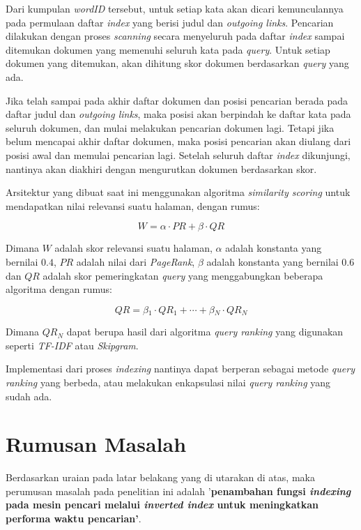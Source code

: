 Dari kumpulan \emph{wordID} tersebut, untuk setiap kata akan dicari
kemunculannya pada permulaan daftar \emph{index} yang berisi judul dan
\emph{outgoing links}.  Pencarian dilakukan dengan proses \emph{scanning} secara
menyeluruh pada daftar \emph{index} sampai ditemukan dokumen yang memenuhi
seluruh kata pada \emph{query}. Untuk setiap dokumen yang ditemukan, akan
dihitung skor dokumen berdasarkan \emph{query} yang ada.

Jika telah sampai pada akhir daftar dokumen dan posisi pencarian berada pada
daftar judul dan \emph{outgoing links}, maka posisi akan berpindah ke daftar
kata pada seluruh dokumen, dan mulai melakukan pencarian dokumen lagi. Tetapi
jika belum mencapai akhir daftar dokumen, maka posisi pencarian akan diulang
dari posisi awal dan memulai pencarian lagi. Setelah seluruh daftar
\emph{index} dikunjungi, nantinya akan diakhiri dengan mengurutkan dokumen
berdasarkan skor.

Arsitektur yang dibuat saat ini menggunakan algoritma \emph{similarity scoring}
untuk mendapatkan nilai relevansi suatu halaman, dengan rumus:

\begin{equation}
	W = \alpha{} \cdot{} PR + \beta{} \cdot{} QR
\end{equation}

Dimana $W$ adalah skor relevansi suatu halaman, $\alpha{}$ adalah konstanta yang
bernilai $0.4$, $PR$ adalah nilai dari \emph{PageRank}, $\beta{}$ adalah
konstanta yang bernilai $0.6$ dan $QR$ adalah skor pemeringkatan \emph{query}
yang menggabungkan beberapa algoritma dengan rumus:

\begin{equation}
	QR = \beta{}_1 \cdot{} QR_1 + \cdots{} + \beta{}_N \cdot{} QR_N
\end{equation}

Dimana $QR_N$ dapat berupa hasil dari algoritma \emph{query ranking} yang
digunakan seperti \emph{TF-IDF} atau \emph{Skipgram}.

Implementasi dari proses \emph{indexing} nantinya dapat berperan sebagai
metode \emph{query ranking} yang berbeda, atau melakukan enkapsulasi nilai
\emph{query ranking} yang sudah ada.

\section{Rumusan Masalah}
Berdasarkan uraian pada latar belakang yang di utarakan di atas, maka perumusan
masalah pada penelitian ini adalah '\textbf{penambahan fungsi \textit{indexing}
pada mesin pencari melalui \textit{inverted index} untuk meningkatkan performa
waktu pencarian'}.

